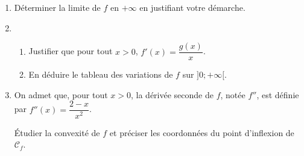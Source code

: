 \begin{enumerate}
	\item Déterminer la limite de $f$ en $+\infty$ en justifiant votre démarche.
	\item 
	\begin{enumerate}
		\item Justifier que pour tout $x > 0$, $f'(x) = \dfrac{g(x)}{x}$.
		\item En déduire le tableau des variations de $f$ sur $]0;+\infty[$.
	\end{enumerate}
	\item On admet que, pour tout $x > 0$, la dérivée seconde de $f$, notée $f''$, est définie par $f''(x) = \dfrac{2 - x}{x^2}$.
	
	Étudier la convexité de $f$ et préciser les coordonnées du point d'inflexion de $\mathcal{C}_f$.
\end{enumerate}

